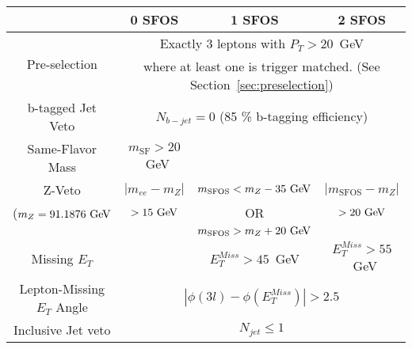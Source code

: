 \begin{tabular}{|c||c||c||c|}
\hline
&  0 SFOS  	& 1 SFOS		  & 2 SFOS  \\
\hline 
\hline 
\multirow{2}{*}{Pre-selection} & \multicolumn{3}{c|}{Exactly 3 leptons with $P_{T} > 20$~GeV}\\
                               & \multicolumn{3}{c|}{where at least one is trigger matched.  (See Section~\ref{sec:preselection}) }\\
\hline 
b-tagged Jet Veto	& \multicolumn{3}{c|}{$N_{b-jet} = 0$ (85 \% b-tagging efficiency)} \\
\hline 
Same-Flavor Mass &	$m_{\textrm{SF}} > 20$~GeV	& \multicolumn{2}{c|}{} \\
\hline 
Z-Veto                &  $|m_{ee}-m_Z|$ & $m_{\textrm{SFOS}} < m_{Z}-35\GeV$ & $|m_{\textrm{SFOS}}-m_Z|$ \\
($m_Z = 91.1876\GeV$  &  $>15\GeV$                                         & OR   &  $>20\GeV$\\
                      & 					  & $m_{\textrm{SFOS}}>m_{Z}+20\GeV$	   &  \\
\hline 
Missing $E_{T}$		& 		& $E_{T}^{Miss} > 45$~GeV & $E_{T}^{Miss} > 55$~GeV \\
\hline 
Lepton-Missing $E_{T}$ Angle 	& 	\multicolumn{3}{c|}{$|\phi(3l)-\phi(E_{T}^{Miss})| > 2.5$} \\
\hline 
Inclusive Jet veto	& \multicolumn{3}{c|}{$N_{jet} \leq 1$} \\
\hline 
\end{tabular}
